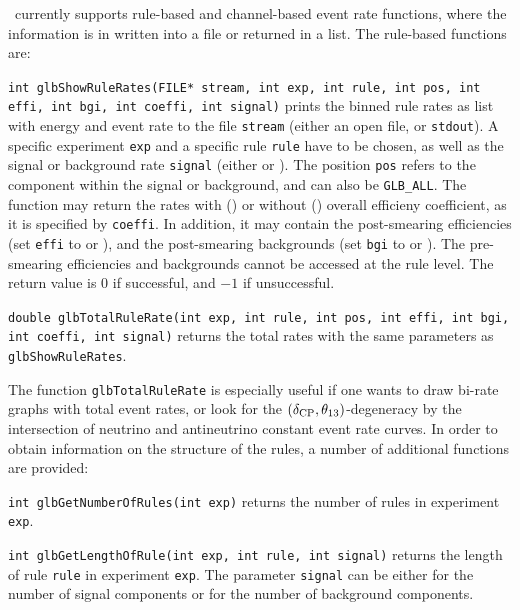 \GLOBES\ currently supports rule-based and channel-based event rate functions, where the information is in written into a file
or returned in a list. The rule-based functions are:
\begin{function}
{\tt int glbShowRuleRates(FILE* stream, int exp, int rule, int pos,
int effi, int bgi, int coeffi, int signal)} prints the binned rule rates as
list with energy and event rate to the file {\tt stream} (either an
open file, or {\tt stdout}). A specific experiment {\tt exp} and a 
specific rule {\tt rule} have to be chosen, as well as the signal
or background rate {\tt signal} (either  or ).
The position {\tt pos} refers to the component within the signal or 
background, and can also be {\tt GLB\_ALL}. The function may return
the rates with () or without ()
overall efficieny coefficient, as it is specified by {\tt coeffi}. 
In addition, it may contain the post-smearing efficiencies (set
{\tt effi} to  or ), and the
post-smearing backgrounds (set
{\tt bgi} to  or ). The pre-smearing
efficiencies and backgrounds cannot be accessed at the rule level.
The return value
is $0$ if successful, and $-1$ if unsuccessful.
\end{function}
\begin{function}
{\tt double glbTotalRuleRate(int exp, int rule, int pos,
int effi, int bgi, int coeffi, int signal)} returns the total rates with
the same parameters as {\tt glbShowRuleRates}.
\end{function}
The function {\tt glbTotalRuleRate} is especially useful if
one wants to draw bi-rate graphs with total event rates, or look
for the $(\delta_{\mathrm{CP}},\theta_{13})$-degeneracy by the intersection of 
neutrino and antineutrino constant event rate curves.
%
In order to obtain information on the structure of the rules, 
a number of additional functions are provided:
\begin{function}
{\tt int glbGetNumberOfRules(int exp)} returns the number of
rules in experiment {\tt exp}.
\end{function}
\begin{function}
{\tt int glbGetLengthOfRule(int exp, int rule, int signal)} returns
the length of rule {\tt rule} in experiment {\tt exp}. The parameter
{\tt signal} can be either  for the number of signal
components or  for the number of background components.
\end{function}
